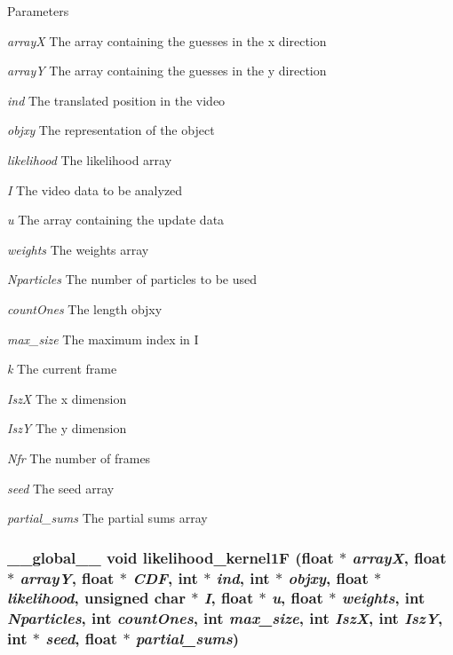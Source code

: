 \begin{DoxyParams}{Parameters}
\item[{\em arrayX}]The array containing the guesses in the x direction \item[{\em arrayY}]The array containing the guesses in the y direction \item[{\em ind}]The translated position in the video \item[{\em objxy}]The representation of the object \item[{\em likelihood}]The likelihood array \item[{\em I}]The video data to be analyzed \item[{\em u}]The array containing the update data \item[{\em weights}]The weights array \item[{\em Nparticles}]The number of particles to be used \item[{\em countOnes}]The length objxy \item[{\em max\_\-size}]The maximum index in I \item[{\em k}]The current frame \item[{\em IszX}]The x dimension \item[{\em IszY}]The y dimension \item[{\em Nfr}]The number of frames \item[{\em seed}]The seed array \item[{\em partial\_\-sums}]The partial sums array \end{DoxyParams}
\hypertarget{ex__particle__CUDA__float_8cu_afd684a13a1604838afc867cdfe5b3c37}{
\subsubsection[{likelihood\_\-kernel1F}]{\setlength{\rightskip}{0pt plus 5cm}\_\-\_\-global\_\-\_\- void likelihood\_\-kernel1F (float $\ast$ {\em arrayX}, \/  float $\ast$ {\em arrayY}, \/  float $\ast$ {\em CDF}, \/  int $\ast$ {\em ind}, \/  int $\ast$ {\em objxy}, \/  float $\ast$ {\em likelihood}, \/  unsigned char $\ast$ {\em I}, \/  float $\ast$ {\em u}, \/  float $\ast$ {\em weights}, \/  int {\em Nparticles}, \/  int {\em countOnes}, \/  int {\em max\_\-size}, \/  int {\em IszX}, \/  int {\em IszY}, \/  int $\ast$ {\em seed}, \/  float $\ast$ {\em partial\_\-sums})}}
